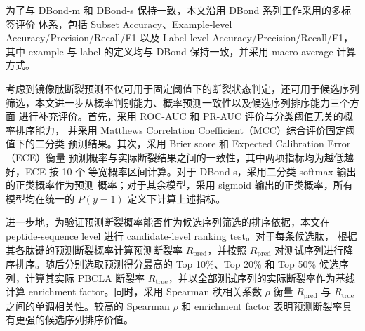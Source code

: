 %
%

为了与 DBond-m 和 DBond-s 保持一致，本文沿用 DBond 系列工作采用的多标签评价
体系，包括 Subset Accuracy、Example-level Accuracy/Precision/Recall/F1 以及
Label-level Accuracy/Precision/Recall/F1，其中 example 与 label 的定义均与
DBond 保持一致，并采用 macro-average 计算方式。

考虑到镜像肽断裂预测不仅可用于固定阈值下的断裂状态判定，还可用于候选序列
筛选，本文进一步从概率判别能力、概率预测一致性以及候选序列排序能力三个方面
进行补充评价。首先，采用 ROC-AUC 和 PR-AUC 评价与分类阈值无关的概率排序能力，
并采用 Matthews Correlation Coefficient（MCC）综合评价固定阈值下的二分类
预测结果。其次，采用 Brier score 和 Expected Calibration Error（ECE）衡量
预测概率与实际断裂结果之间的一致性，其中两项指标均为越低越好，ECE 按 10 个
等宽概率区间计算。对于 DBond-s，采用二分类 softmax 输出的正类概率作为预测
概率；对于其余模型，采用 sigmoid 输出的正类概率，所有模型均在统一的
$P(y=1)$ 定义下计算上述指标。

进一步地，为验证预测断裂概率能否作为候选序列筛选的排序依据，本文在
peptide-sequence level 进行 candidate-level ranking test。对于每条候选肽，
根据其各肽键的预测断裂概率计算预测断裂率 $R_{\text{pred}}$，并按照
$R_{\text{pred}}$ 对测试序列进行降序排序。随后分别选取预测得分最高的
Top 10\%、Top 20\% 和 Top 50\% 候选序列，计算其实际 PBCLA 断裂率
$R_{\text{true}}$，并以全部测试序列的实际断裂率作为基线计算 enrichment
factor。同时，采用 Spearman 秩相关系数 $\rho$ 衡量 $R_{\text{pred}}$ 与
$R_{\text{true}}$ 之间的单调相关性。较高的 Spearman $\rho$ 和 enrichment
factor 表明预测断裂率具有更强的候选序列排序价值。

